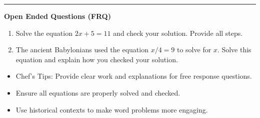 \documentclass[10pt]{article}
\begin{document}
\vspace{-0.2cm}
\hrule
\vspace{0.2cm}
\textbf{\small Open Ended Questions (FRQ)}
\begin{enumerate}[label=\textbf{Q\arabic*.}, start=9, itemsep=5pt, topsep=0pt]

  \item \small Solve the equation $2x + 5 = 11$ and check your solution. Provide all steps. \vspace{2cm}

  \item \small The ancient Babylonians used the equation $x/4 = 9$ to solve for $x$. Solve this equation and explain how you checked your solution. \vspace{2cm}

\end{enumerate}

\vfill

\begin{tcolorbox}[colback=blue!5, colframe=mainblue!50, title=\small \textbf{Chef's Tips}, fonttitle=\bfseries, bottom=1mm]
\begin{itemize}[noitemsep, topsep=2pt, leftmargin=0.5cm]
  \item \scriptsize Chef's Tips: Provide clear work and explanations for free response questions.\item \scriptsize Ensure all equations are properly solved and checked.\item \scriptsize Use historical contexts to make word problems more engaging.
\end{itemize}
\end{tcolorbox}
\end{document}
